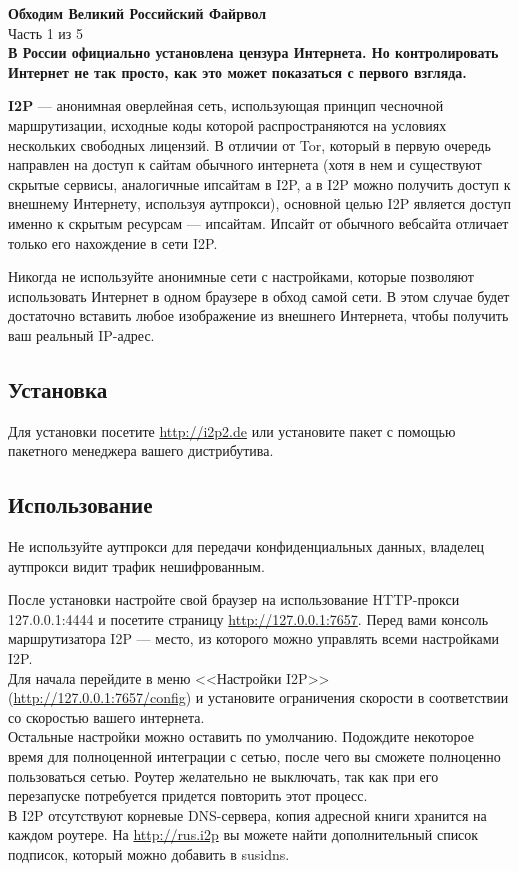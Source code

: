 \begin{center}
\LARGE \textbf{Обходим Великий Российский Файрвол}\\
\large Часть 1 из 5\\
\normalsize\textbf{В России официально установлена цензура Интернета. Но контролировать Интернет не так просто, как это может показаться с первого взгляда.}
\end{center}
\begin{figure}[h]
\center{\texttt{[image: I2P]}}
\end{figure}
\textbf{I2P} --- анонимная оверлейная сеть, использующая принцип чесночной маршрутизации, исходные коды которой распространяются на условиях нескольких свободных лицензий. В отличии от Tor, который в первую очередь направлен на доступ к сайтам обычного интернета (хотя в нем и существуют скрытые сервисы, аналогичные ипсайтам в I2P, а в I2P можно получить доступ к внешнему Интернету, используя аутпрокси), основной целью I2P является доступ именно к скрытым ресурсам --- ипсайтам. Ипсайт от обычного вебсайта отличает только его нахождение в сети I2P.
\begin{important}
Никогда не используйте анонимные сети с настройками, которые позволяют использовать Интернет в одном браузере в обход самой сети. В этом случае будет достаточно вставить любое изображение из внешнего Интернета, чтобы получить ваш реальный IP-адрес.
\end{important}
\subsection*{Установка}
Для установки посетите \url{http://i2p2.de} или установите пакет с помощью пакетного менеджера вашего дистрибутива.
\subsection*{Использование}
\begin{important}
Не используйте аутпрокси для передачи конфиденциальных данных, владелец аутпрокси видит трафик нешифрованным.
\end{important}
После установки настройте свой браузер на использование HTTP-прокси 127.0.0.1:4444 и посетите страницу \url{http://127.0.0.1:7657}. Перед вами консоль маршрутизатора I2P --- место, из которого можно управлять всеми настройками I2P.\\
Для начала перейдите в меню <<Настройки I2P>> (\url{http://127.0.0.1:7657/config}) и установите ограничения скорости в соответствии со скоростью вашего интернета.\\
Остальные настройки можно оставить по умолчанию. Подождите некоторое время для полноценной интеграции с сетью, после чего вы сможете полноценно пользоваться сетью. Роутер желательно не выключать, так как при его перезапуске потребуется придется повторить этот процесс.\\
В I2P отсутствуют корневые DNS-сервера, копия адресной книги хранится на каждом роутере. На \url{http://rus.i2p} вы можете найти дополнительный список подписок, который можно добавить в susidns.
